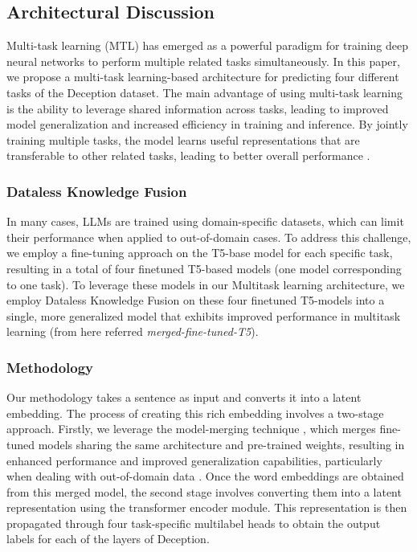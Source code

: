 \subsection{Architectural Discussion}


 Multi-task learning (MTL) has emerged as a powerful paradigm for training deep neural networks to perform multiple related tasks simultaneously. In this paper, we propose a multi-task learning-based architecture for predicting four different tasks of the Deception dataset. The main advantage of using multi-task learning is the ability to leverage shared information across tasks, leading to improved model generalization and increased efficiency in training and inference. By jointly training multiple tasks, the model learns useful representations that are transferable to other related tasks, leading to better overall performance \cite{caruana1997multitask}. 

 \subsubsection{Dataless Knowledge Fusion}

 In many cases, LLMs are trained using domain-specific datasets, which can limit their performance when applied to out-of-domain cases. To address this challenge, we employ a fine-tuning approach on the T5-base model for each specific task, resulting in a total of four finetuned T5-based models (one model corresponding to one task). To leverage these models in our Multitask learning architecture, we employ Dataless Knowledge Fusion \cite{jin2022dataless} on these four finetuned T5-models into a single, more generalized model that exhibits improved performance in multitask learning (from here referred \textit{merged-fine-tuned-T5}).

 \subsubsection{Methodology}

 Our methodology takes a sentence as input and converts it into a latent embedding. The process of creating this rich embedding involves a two-stage approach. Firstly, we leverage the model-merging technique \cite{jin2022dataless}, which merges fine-tuned models sharing the same architecture and pre-trained weights, resulting in enhanced performance and improved generalization capabilities, particularly when dealing with out-of-domain data \cite{jin2022dataless}. Once the word embeddings are obtained from this merged model, the second stage involves converting them into a latent representation using the transformer encoder module. This representation is then propagated through four task-specific multilabel heads to obtain the output labels for each of the layers of Deception. 

